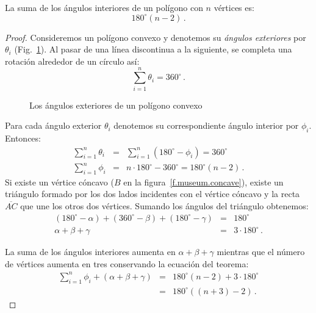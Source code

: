 \begin{theorem}\label{thm.interior-angles-of-a-polygon}
La suma de los ángulos interiores de un polígono con $n$ vértices es:
\[180^\circ(n-2)\,.\]
\end{theorem}
\begin{proof}
Consideremos un polígono convexo y denotemos su \emph{ángulos exteriores} por $\theta_i$ (Fig.~\ref{f.museum.exterior}).
Al pasar de una línea discontinua a la siguiente, se completa una rotación alrededor de un círculo así:
\[
\sum_{i=1}^n \theta_i = 360^\circ\,.
\]
\begin{figure}[t]
\begin{center}
\end{center}
\caption{Los ángulos exteriores de un polígono convexo}\label{f.museum.exterior}
\end{figure}
Para cada ángulo exterior $\theta_i$ denotemos su correspondiente ángulo interior por $\phi_i$. Entonces:
\begin{eqnarray*}
\displaystyle\sum_{i=1}^n \theta_i &=&\displaystyle\sum_{i=1}^n (180^\circ-\phi_i)= 360^\circ\\
\displaystyle\sum_{i=1}^n \phi_i &=& n\cdot 180^\circ-360^\circ =180^\circ(n-2)\,.
\end{eqnarray*}
Si existe un vértice cóncavo ($B$ en la figura~\ref{f.museum.concave}), existe un triángulo formado por los dos lados incidentes con el vértice cóncavo y la recta $\overline{AC}$ que une los otros dos vértices. Sumando los ángulos del triángulo obtenemos:
\begin{eqnarray*}
(180^\circ - \alpha) + (360^\circ - \beta) + (180^\circ - \gamma) &=& 180^\circ\\
\alpha + \beta + \gamma &=& 3\cdot 180^\circ\,.
\end{eqnarray*}

La suma de los ángulos interiores aumenta en $\alpha+\beta+\gamma$ mientras que el número de vértices aumenta en tres conservando la ecuación del teorema:
\begin{eqnarray*}
\displaystyle\sum_{i=1}^n \phi_i + (\alpha + \beta + \gamma) &=& 180^\circ(n-2)+3\cdot 180^\circ\\
&=& 180^\circ((n+3)-2)\,.
\end{eqnarray*}
\end{proof}

